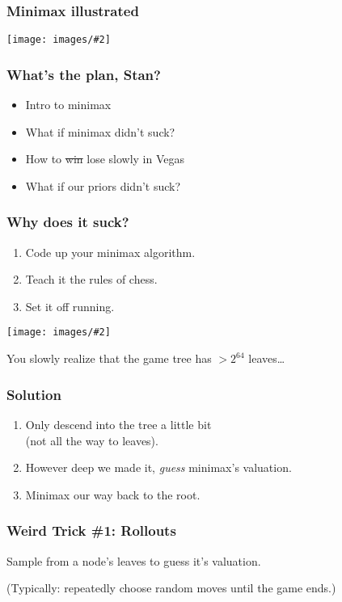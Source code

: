 \documentclass[table]{beamer}
\newcommand\img[2]{\texttt{[image: images/\#2]}}
\begin{document}
\begin{frame}
	\frametitle{Minimax illustrated}
	\begin{center}
		\img{1}{games-7.jpg}
	\end{center}
\end{frame}

\begin{frame}
	\frametitle{What's the plan, Stan?}
	\begin{itemize}
		\setlength\itemsep{5ex}
		\item Intro to minimax
		\item \alert{What if minimax didn't suck?}
		\item How to \sout{win} lose slowly in Vegas
		\item What if our priors didn't suck?
	\end{itemize}
\end{frame}

\begin{frame}
	\frametitle{Why does it suck?}
	\begin{enumerate}
		\item Code up your minimax algorithm.
		\item Teach it the rules of chess.
		\item Set it off running.
	\end{enumerate}

	\begin{center}
		\img{0.4}{hourglass.jpg}
	\end{center}

	You slowly realize that the game tree has $>2^{64}$ leaves\ldots
\end{frame}

\begin{frame}
	\frametitle{Solution}
	\begin{enumerate}
		\item Only descend into the tree a little bit\\(not all the way to
			leaves).
		\item However deep we made it, \emph{guess}\footnotemark{} minimax's valuation.
		\item Minimax our way back to the root.
	\end{enumerate}
\end{frame}

\begin{frame}
	\frametitle{Weird Trick \#1: Rollouts}
	\alert{Sample} from a node's leaves to guess it's valuation.

	\vspace{8ex}

	(Typically: repeatedly choose random moves until the game ends.)
\end{frame}
\end{document}
